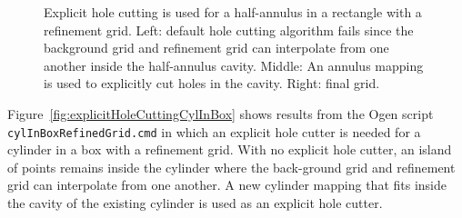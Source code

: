 \documentclass[xcolor=rgb,svgnames,dvipsnames]{article}
\newcommand{\figures}{\homeHenshaw/OvertureFigures}
\begin{document}
{
\newcommand{\figWidthd}{5.75cm}
\newcommand{\trimfig}[2]{\trimPlot{#1}{#2}{.10}{.10}{.15}{.30}}
\begin{figure}[hbt]
\begin{center}
\end{center}
  \caption{Explicit hole cutting is used for a half-annulus in a rectangle with a refinement grid. Left: default hole cutting algorithm
      fails since the background grid and refinement grid can interpolate from one another inside the half-annulus cavity. 
    Middle: An annulus mapping is used to explicitly cut holes in the cavity. Right: final grid.} 
 \label{fig:explicitHoleCuttingHalfAnnulus}
\end{figure}
}


Figure~\ref{fig:explicitHoleCuttingCylInBox} shows results from  the Ogen script {\tt cylInBoxRefinedGrid.cmd} in which
an explicit hole cutter is needed for a cylinder in a box with a refinement grid.
With no explicit hole cutter, an island of points remains inside the cylinder where the back-ground 
grid and refinement grid can interpolate from one another. A new cylinder mapping that fits inside the cavity of the 
existing cylinder is used as an explicit hole cutter. 
\end{document}
